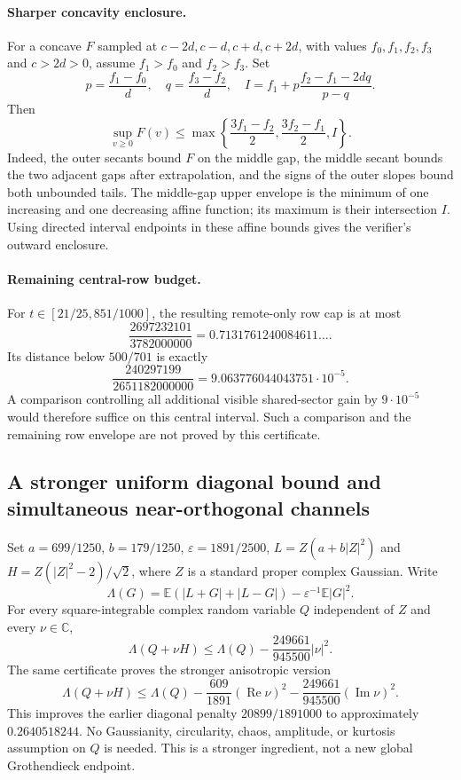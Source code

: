 \paragraph{Sharper concavity enclosure.}
For a concave $F$ sampled at $c-2d,c-d,c+d,c+2d$, with values
$f_0,f_1,f_2,f_3$ and $c>2d>0$, assume $f_1>f_0$ and $f_2>f_3$.
Set
\[
 p=\frac{f_1-f_0}{d},\quad q=\frac{f_3-f_2}{d},\quad
 I=f_1+p\frac{f_2-f_1-2dq}{p-q}.
\]
Then
\[
 \sup_{v\ge0}F(v)\le
 \max\left\{\frac{3f_1-f_2}{2},
             \frac{3f_2-f_1}{2},I\right\}.
\]
Indeed, the outer secants bound $F$ on the middle gap, the middle secant
bounds the two adjacent gaps after extrapolation, and the signs of the
outer slopes bound both unbounded tails. The middle-gap upper envelope is
the minimum of one increasing and one decreasing affine function; its
maximum is their intersection $I$. Using directed interval endpoints in
these affine bounds gives the verifier's outward enclosure.

\paragraph{Remaining central-row budget.}
For $t\in[21/25,851/1000]$, the resulting remote-only row cap is at most
\[
 \frac{2697232101}{3782000000}=0.7131761240084611\ldots.
\]
Its distance below $500/701$ is exactly
\[
 \frac{240297199}{2651182000000}
   =9.063776044043751\cdot10^{-5}.
\]
A comparison controlling all additional visible shared-sector gain by
$9\cdot10^{-5}$ would therefore suffice on this central interval.
Such a comparison and the remaining row envelope are not proved by this
certificate.
\subsection{A stronger uniform diagonal bound and simultaneous near-orthogonal channels}
\label{sec:diagonal-gaussian-envelope}
Set $a=699/1250$, $b=179/1250$, $\varepsilon=1891/2500$,
$L=Z(a+b|Z|^2)$ and $H=Z(|Z|^2-2)/\sqrt2$, where $Z$ is a standard proper complex Gaussian. Write
\[
 \Lambda(G)=\mathbb E(|L+G|+|L-G|)-\varepsilon^{-1}\mathbb E|G|^2.
\]
For every square-integrable complex random variable $Q$ independent of $Z$ and every $\nu\in\mathbb C$,
\begin{equation}\label{eq:new-diagonal-removal}
 \boxed{\Lambda(Q+\nu H)\le\Lambda(Q)-\frac{249661}{945500}|\nu|^2.}
\end{equation}
The same certificate proves the stronger anisotropic version
\[
 \Lambda(Q+\nu H)\le\Lambda(Q)-\frac{609}{1891}(\operatorname{Re}\nu)^2
 -\frac{249661}{945500}(\operatorname{Im}\nu)^2.
\]
This improves the earlier diagonal penalty $20899/1891000$ to approximately $0.2640518244$. No Gaussianity, circularity, chaos, amplitude, or kurtosis assumption on $Q$ is needed. This is a stronger ingredient, not a new global Grothendieck endpoint.

